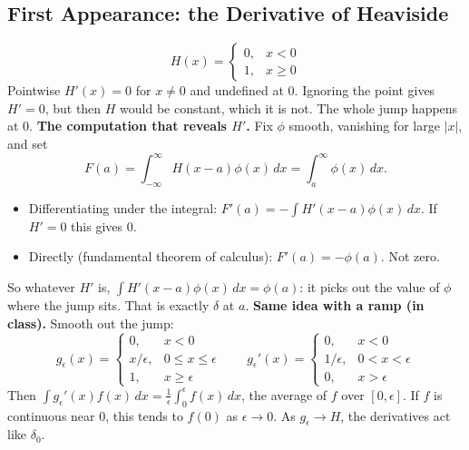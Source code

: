 \documentclass{article}
\begin{document}
\subsection{First Appearance: the Derivative of Heaviside}
\begin{equation}
    H(x) = \begin{cases} 0, & x < 0 \\ 1, & x \geq 0 \end{cases}
\end{equation}
Pointwise $H'(x) = 0$ for $x \neq 0$ and undefined at $0$. Ignoring the point gives $H' = 0$, but then $H$ would be constant, which it is not. The whole jump happens at $0$.
\textbf{The computation that reveals $H'$.} Fix $\phi$ smooth, vanishing for large $|x|$, and set
\begin{equation}
    F(a) = \int_{-\infty}^{\infty} H(x-a)\phi(x)\,dx = \int_a^{\infty} \phi(x)\,dx.
\end{equation}
\begin{itemize}
    \item Differentiating under the integral: $F'(a) = -\int H'(x-a)\phi(x)\,dx$. If $H' = 0$ this gives $0$.
    \item Directly (fundamental theorem of calculus): $F'(a) = -\phi(a)$. Not zero.
\end{itemize}
So whatever $H'$ is, $\int H'(x-a)\phi(x)\,dx = \phi(a)$: it picks out the value of $\phi$ where the jump sits. That is exactly $\delta$ at $a$.
\textbf{Same idea with a ramp (in class).} Smooth out the jump:
\begin{equation}
    g_\epsilon(x) = \begin{cases} 0, & x < 0 \\ x/\epsilon, & 0 \leq x \leq \epsilon \\ 1, & x \geq \epsilon \end{cases}
    \qquad
    g_\epsilon'(x) = \begin{cases} 0, & x < 0 \\ 1/\epsilon, & 0 < x < \epsilon \\ 0, & x > \epsilon \end{cases}
\end{equation}
Then $\int g_\epsilon'(x) f(x)\,dx = \frac{1}{\epsilon}\int_0^\epsilon f(x)\,dx$, the average of $f$ over $[0,\epsilon]$. If $f$ is continuous near $0$, this tends to $f(0)$ as $\epsilon \to 0$. As $g_\epsilon \to H$, the derivatives act like $\delta_0$.
\end{document}
